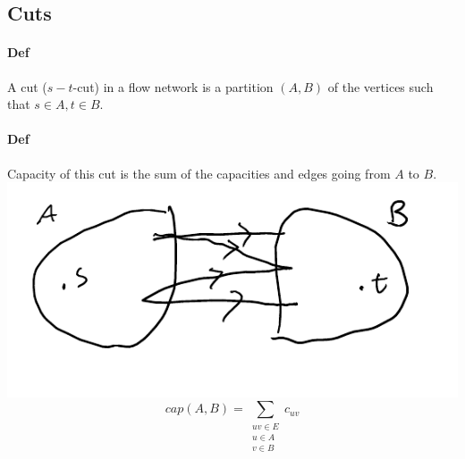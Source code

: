 \documentclass[12 pt]{article}
\begin{document}
        \subsection{Cuts}
        \paragraph{Def} A cut ($s-t$-cut) in a flow network is a
        partition $(A,B)$ of the vertices such that $s \in A, t\in B$.
        \paragraph{Def} Capacity of this cut is the sum of the
        capacities and edges going from $A$ to $B$.
        \\ \includegraphics[width=.7\textwidth]{i19.pdf}
        $$cap(A,B)=\sum_{\substack{uv\in E \\ u \in A \\ v \in B}} c_{uv}$$
\end{document}
